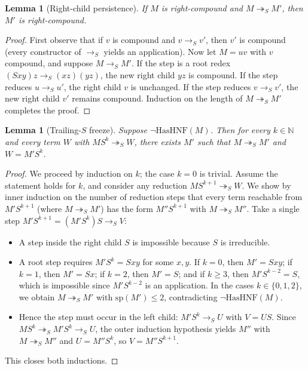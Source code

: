 \documentclass[11pt,reqno]{amsart}
\newtheorem{lemma}[theorem]{Lemma}
\theoremstyle{definition}
\theoremstyle{remark}
\newcommand{\toS}{\to_S}
\newcommand{\redS}{\twoheadrightarrow_S}
\begin{document}
\begin{lemma}[Right-child persistence]\label{lem:right-app}
If $M$ is right-compound and $M \redS M'$, then $M'$ is right-compound.
\end{lemma}

\begin{proof}
First observe that if $v$ is compound and $v \toS v'$, then $v'$ is compound (every constructor of $\toS$ yields an application). Now let $M = u v$ with $v$ compound, and suppose $M \toS M'$. If the step is a root redex $(S x y) z \toS (x z)(y z)$, the new right child $y z$ is compound. If the step reduces $u \toS u'$, the right child $v$ is unchanged. If the step reduces $v \toS v'$, the new right child $v'$ remains compound. Induction on the length of $M \redS M'$ completes the proof.
\end{proof}

\begin{lemma}[Trailing-$S$ freeze]\label{lem:freeze}
Suppose $\neg \mathrm{HasHNF}(M)$. Then for every $k \in \mathbb{N}$ and every term $W$ with $M S^k \redS W$, there exists $M'$ such that $M \redS M'$ and $W = M' S^k$.
\end{lemma}

\begin{proof}
We proceed by induction on $k$; the case $k = 0$ is trivial. Assume the statement holds for $k$, and consider any reduction $M S^{k+1} \redS W$. We show by inner induction on the number of reduction steps that every term reachable from $M' S^{k+1}$ (where $M \redS M'$) has the form $M'' S^{k+1}$ with $M \redS M''$. Take a single step $M' S^{k+1} = (M' S^k) S \toS V$:
\begin{itemize}
  \item A step inside the right child $S$ is impossible because $S$ is irreducible.
  \item A root step requires $M' S^k = S x y$ for some $x, y$. If $k = 0$, then $M' = S x y$; if $k = 1$, then $M' = S x$; if $k = 2$, then $M' = S$; and if $k \ge 3$, then $M' S^{k-2} = S$, which is impossible since $M' S^{k-2}$ is an application. In the cases $k \in \{0, 1, 2\}$, we obtain $M \redS M'$ with $\mathrm{sp}(M') \le 2$, contradicting $\neg \mathrm{HasHNF}(M)$.
  \item Hence the step must occur in the left child: $M' S^k \toS U$ with $V = U S$. Since $M S^k \redS M' S^k \toS U$, the outer induction hypothesis yields $M''$ with $M \redS M''$ and $U = M'' S^k$, so $V = M'' S^{k+1}$.
\end{itemize}
This closes both inductions.
\end{proof}
\end{document}
